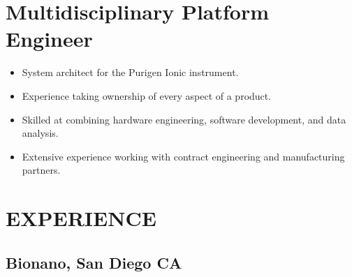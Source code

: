 \documentclass{res}
\begin{document}

\address{5210 Fiore Terrace L205 \\ San Diego, CA 92122 \\ (650) 391-8463}

\address{Citizenship: United States \\ \\ lewis.a.marshall@gmail.com}

\begin{resume}

\section{Multidisciplinary Platform Engineer}
  \begin{itemize}
    \item System architect for the Purigen Ionic instrument.
    \item Experience taking ownership of every aspect of a product.
    \item Skilled at combining hardware engineering, software development, and data analysis.
    \item Extensive experience working with contract engineering and manufacturing partners.
  \end{itemize}



\vspace{-0.2in}
\section{EXPERIENCE}
\vspace{-0.1in}


   \subsection{Bionano, San Diego CA}
    \vspace{-0.2in}

\end{resume}
\end{document}
